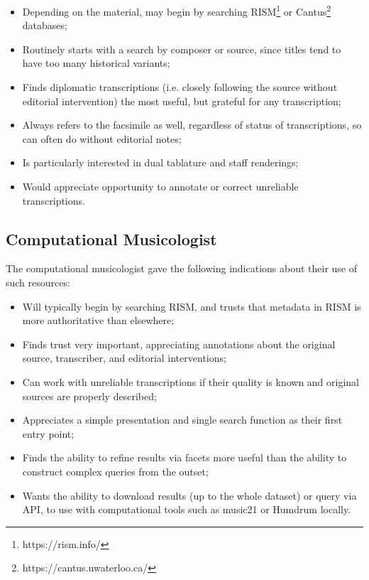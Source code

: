 \documentclass[9pt,twocolumn]{extarticle}
\begin{document}
\begin{sloppypar}
  \begin{itemize}
    \item Depending on the material, may begin by searching
      RISM\footnote{https://rism.info/} or
      Cantus\footnote{https://cantus.uwaterloo.ca/} databases;
    \item Routinely starts with a search by composer or source, since
      titles tend to have too many historical variants;
    \item Finds diplomatic transcriptions (i.e. closely following
      the source without editorial intervention) the most useful,
      but grateful for any transcription;
    \item Always refers to the facsimile as well, regardless of status
      of transcriptions, so can often do without editorial notes;
    \item Is particularly interested in dual tablature and staff
      renderings;
    \item Would appreciate opportunity to annotate or correct
      unreliable transcriptions.
  \end{itemize}
  
  \subsection{Computational Musicologist}

  The computational musicologist gave the following indications about
  their use of such resources:

  \begin{itemize}
  \item Will typically begin by searching RISM, and trusts that
    metadata in RISM is more authoritative than elsewhere;
  \item Finds trust very important, appreciating annotations about the
    original source, transcriber, and editorial interventions;
  \item Can work with unreliable transcriptions if their quality is
    known and original sources are properly described;
  \item Appreciates a simple presentation and single search function
    as their first entry point;
  \item Finds the ability to refine results via facets more useful
    than the ability to construct complex queries from the outset;
  \item Wants the ability to download results (up to the whole
    dataset) or query via API, to use with computational tools such
    as music21 or Humdrum locally.
  \end{itemize}
  

\end{sloppypar}
\end{document}
